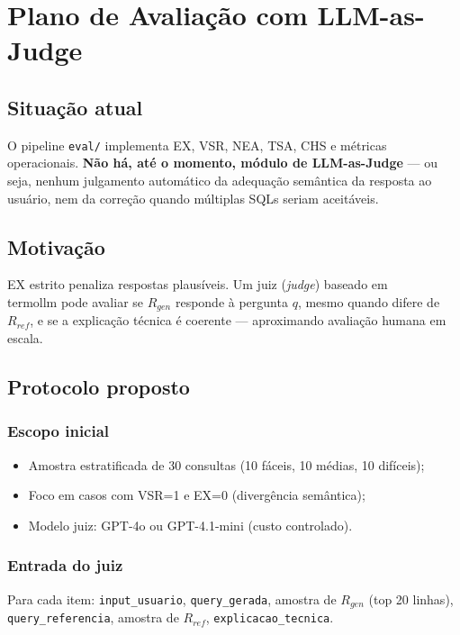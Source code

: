\chapter{Plano de Avaliação com LLM-as-Judge}
\label{sec:plano-judge}

\section{Situação atual}

O pipeline \texttt{eval/} implementa EX, VSR, NEA, TSA, CHS e métricas operacionais. \textbf{Não há, até o momento, módulo de LLM-as-Judge} --- ou seja, nenhum julgamento automático da adequação semântica da resposta ao usuário, nem da correção quando múltiplas SQLs seriam aceitáveis.

\section{Motivação}

EX estrito penaliza respostas plausíveis. Um juiz (\textit{judge}) baseado em \\termo{llm} pode avaliar se $R_{gen}$ responde à pergunta $q$, mesmo quando difere de $R_{ref}$, e se a explicação técnica é coerente --- aproximando avaliação humana em escala.

\section{Protocolo proposto}

\subsection{Escopo inicial}

\begin{itemize}
    \item Amostra estratificada de 30 consultas (10 fáceis, 10 médias, 10 difíceis);
    \item Foco em casos com VSR=1 e EX=0 (divergência semântica);
    \item Modelo juiz: GPT-4o ou GPT-4.1-mini (custo controlado).
\end{itemize}

\subsection{Entrada do juiz}

Para cada item: \texttt{input\_usuario}, \texttt{query\_gerada}, amostra de $R_{gen}$ (top 20 linhas), \texttt{query\_referencia}, amostra de $R_{ref}$, \texttt{explicacao\_tecnica}.

